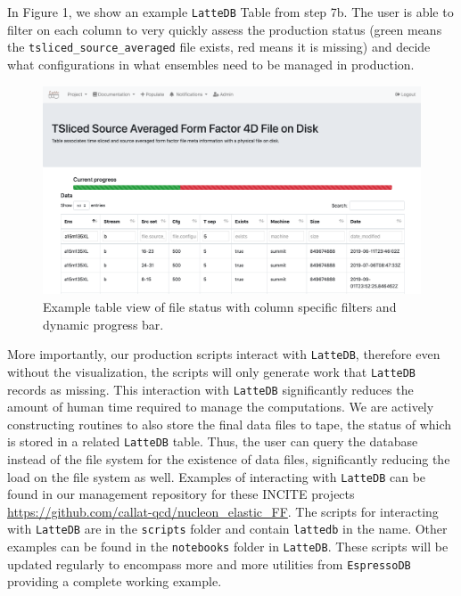 In Figure 1, we show an example \texttt{LatteDB} Table from step 7b. The
user is able to filter on each column to very quickly assess the
production status (green means the \texttt{tsliced\_source\_averaged} file
exists, red means it is missing) and decide what configurations in what
ensembles need to be managed in production.

\begin{figure}[t!]
\centering
\includegraphics{lattedb-example.png}
\caption{Example table view of file status with column specific filters
and dynamic progress bar.}
\end{figure}

More importantly, our production scripts interact with \texttt{LatteDB},
therefore even without the visualization, the scripts will only generate
work that \texttt{LatteDB} records as missing. This interaction with
\texttt{LatteDB} significantly reduces the amount of human time required
to manage the computations. We are actively constructing routines to
also store the final data files to tape, the status of which is stored
in a related \texttt{LatteDB} table. Thus, the user can query the
database instead of the file system for the existence of data files,
significantly reducing the load on the file system as well.
Examples of interacting with \texttt{LatteDB} can be found in
our management repository for these INCITE projects
\url{https://github.com/callat-qcd/nucleon_elastic_FF}.
The scripts for interacting with \texttt{LatteDB} are in the \texttt{scripts} folder and contain \texttt{lattedb} in the name.
Other examples can be found in the \texttt{notebooks} folder in
\texttt{LatteDB}. These scripts will be updated regularly to encompass
more and more utilities from \texttt{EspressoDB} providing a complete
working example.


